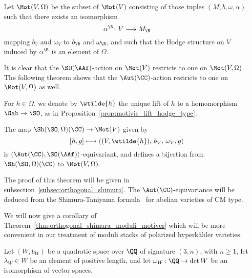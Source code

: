 \begin{definition}\label{def:mot(SO,O)}
Let $\Mot(V,\Omega)$ be the subset of $\Mot(V)$ consisting of those tuples $(M,b,\omega,\alpha)$ such that there exists an isomorphism
\begin{equation}\label{eq:alphaB}
\alpha^{\B}\colon V \longrightarrow M_{\B}
\end{equation}
mapping $b_V$ and $\omega_V$ to $b_{\B}$ and $\omega_{\B}$, and such that the Hodge structure on $V$ induced by $\alpha^{\B}$ is an element of $\Omega$.
\end{definition}

It is clear that the $\SO(\AAf)$-action on $\Mot(V)$ restricts to one on $\Mot(V,\Omega)$. The following theorem shows that the $\Aut(\CC)$-action restricts to one on $\Mot(V,\Omega)$ as well.


For $h \in \Omega$, we denote by $\wtilde{h}$ the unique lift of $h$ to a homomorphism $\Gab \rightarrow \SO$, as in Proposition~\ref{prop:motivic_lift_hodge_type}.

\begin{theorem}\label{thm:orthogonal_shimura_moduli_motives}
The map $\Sh(\SO,\Omega)(\CC) \rightarrow \Mot(V)$ given by 
$$
[h,g] \longmapsto ((V,\wtilde{h}),\, b_V,\, \omega_V,g)
$$ 
is $(\Aut(\CC),\SO(\AAf))$-equivariant, and defines a bijection from $\Sh(\SO,\Omega)(\CC)$ to $\Mot(V,\Omega)$.
\end{theorem}

The proof of this theorem will be given in subsection~\ref{subsec:orthogonal_shimura}. The $\Aut(\CC)$-equivariance will be deduced from the Shimura-Taniyama formula~\cite[Th\'eor\`eme~4.19]{DeligneShimura} for abelian varieties of CM type.

We will now give a corollary of Theorem~\ref{thm:orthogonal_shimura_moduli_motives} which will be more convenient in our treatment of moduli stacks of polarized hyperk\"ahler varieties.

Let $(W,b_W)$ be a quadratic space over $\QQ$ of signature $(3,n)$, with $n \geq 1$, let $\lambda_W \in W$ be an element of positive length, and let $\omega_W\colon \QQ \rightarrow \det W$ be an isomorphism of vector spaces. 


